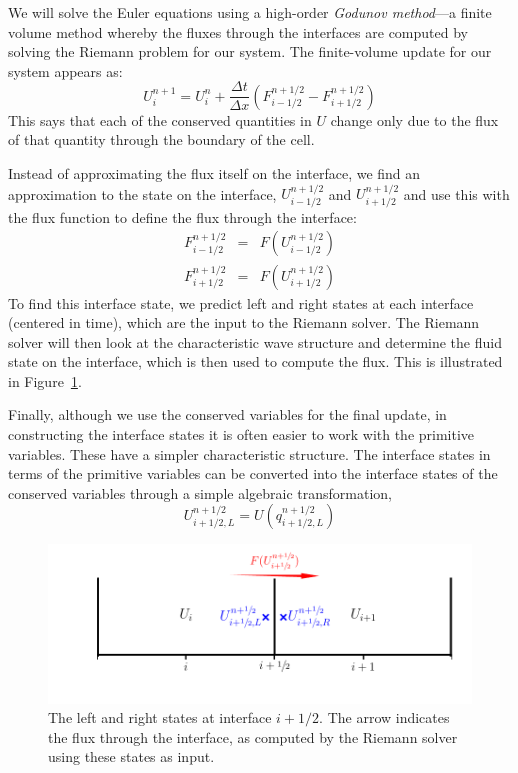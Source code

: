 \label{sec:onedrecon}

We will solve the Euler equations using a high-order {\em Godunov
  method}---a finite volume method whereby the fluxes through the
interfaces are computed by solving the Riemann problem for our system.
The finite-volume update for our system appears as:
\begin{equation}
U^{n+1}_i = U^n_i + \frac{\Delta t}{\Delta x} \left ( F_{i-1/2}^{n+1/2} - F_{i+1/2}^{n+1/2} \right )
\end{equation}
This says that each of the conserved quantities in $U$ change only due
to the flux of that quantity through the boundary of the cell.

Instead of approximating the flux itself on the interface, we find an
approximation to the state on the interface, $U_{i-1/2}^{n+1/2}$ and
$U_{i+1/2}^{n+1/2}$ and use this with the flux function to define the
flux through the interface:
\begin{eqnarray}
F_{i-1/2}^{n+1/2} &=& F(U_{i-1/2}^{n+1/2}) \\
F_{i+1/2}^{n+1/2} &=& F(U_{i+1/2}^{n+1/2})
\end{eqnarray}
To find this interface state, we predict left and right states at each
interface (centered in time), which are the input to the Riemann
solver.  The Riemann solver will then look at the characteristic wave
structure and determine the fluid state on the interface, which is
then used to compute the flux.  This is illustrated in
Figure~\ref{fig:riemann}.  

Finally, although we use the conserved variables for the final update,
in constructing the interface states it is often easier to work with
the primitive variables.  These have a simpler characteristic
structure.  The interface states in terms of the primitive variables
can be converted into the interface states of the conserved variables
through a simple algebraic transformation, 
\begin{equation}
U_{i+1/2,L}^{n+1/2} = U(q_{i+1/2,L}^{n+1/2})
\end{equation}

\begin{figure}[t]
\centering
\includegraphics[width=\linewidth]{riemann_comp}
\caption[The left and right states for the Riemann
  problem.]{\label{fig:riemann} The left and right states at interface
  $i+1/2$.  The arrow indicates the flux through the interface, as
  computed by the Riemann solver using these states as input.}
\end{figure}

